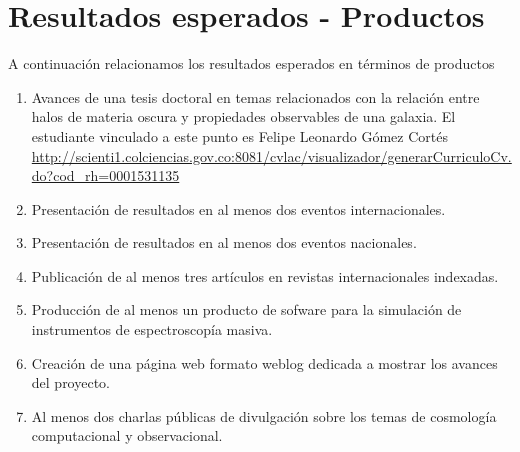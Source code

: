 
\section{Resultados esperados - Productos}


A continuaci\'on relacionamos los resultados esperados en términos de productos 

\begin{enumerate}

\item Avances de una tesis doctoral en temas relacionados con
  la relaci\'on entre halos de materia oscura y propiedades
  observables de una galaxia. 
El estudiante vinculado a este punto 
  es Felipe Leonardo G\'omez Cort\'es
  \url{http://scienti1.colciencias.gov.co:8081/cvlac/visualizador/generarCurriculoCv.do?cod_rh=0001531135}  

\item Presentaci\'on de resultados en al menos dos eventos
  internacionales.  

\item Presentaci\'on de resultados en al menos dos eventos nacionales.

\item Publicaci\'on de al menos tres art\'iculos en revistas
  internacionales indexadas. 

\item Producci\'on de al menos un producto de sofware para la
  simulaci\'on de instrumentos de espectroscop\'ia masiva.  

\item Creaci\'on de una p\'agina web formato weblog dedicada a mostrar
  los avances del proyecto. 

\item Al menos dos charlas p\'ublicas de divulgaci\'on sobre los temas
  de cosmolog\'ia computacional y observacional. 

\end{enumerate}
